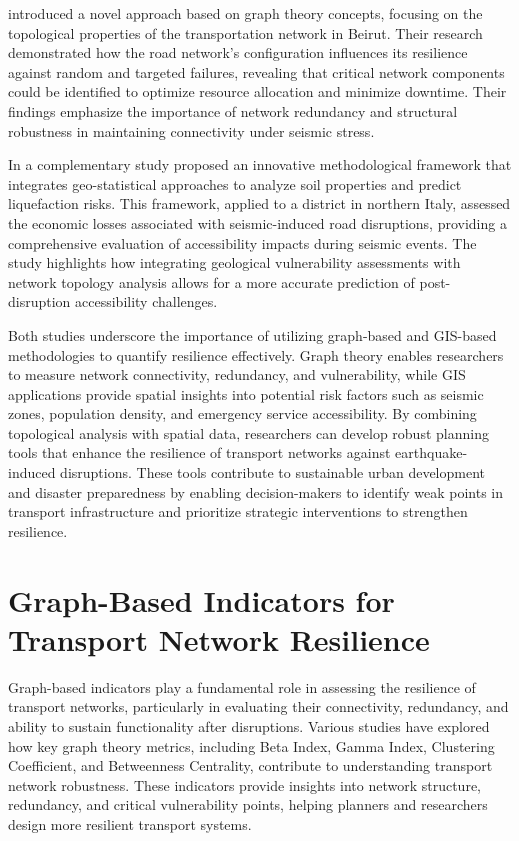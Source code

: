 \cite{rouhana2020} introduced a novel approach based on graph theory concepts, focusing on the topological properties of the transportation network in Beirut. Their research demonstrated how the road network's configuration influences its resilience against random and targeted failures, revealing that critical network components could be identified to optimize resource allocation and minimize downtime. Their findings emphasize the importance of network redundancy and structural robustness in maintaining connectivity under seismic stress.

In a complementary study \cite{ dapuzzo2022} proposed an innovative methodological framework that integrates geo-statistical approaches to analyze soil properties and predict liquefaction risks. This framework, applied to a district in northern Italy, assessed the economic losses associated with seismic-induced road disruptions, providing a comprehensive evaluation of accessibility impacts during seismic events. The study highlights how integrating geological vulnerability assessments with network topology analysis allows for a more accurate prediction of post-disruption accessibility challenges.

Both studies underscore the importance of utilizing graph-based and GIS-based methodologies to quantify resilience effectively. Graph theory enables researchers to measure network connectivity, redundancy, and vulnerability, while GIS applications provide spatial insights into potential risk factors such as seismic zones, population density, and emergency service accessibility. By combining topological analysis with spatial data, researchers can develop robust planning tools that enhance the resilience of transport networks against earthquake-induced disruptions. These tools contribute to sustainable urban development and disaster preparedness by enabling decision-makers to identify weak points in transport infrastructure and prioritize strategic interventions to strengthen resilience.

\section{Graph-Based Indicators for Transport Network Resilience}
Graph-based indicators play a fundamental role in assessing the resilience of transport networks, particularly in evaluating their connectivity, redundancy, and ability to sustain functionality after disruptions. Various studies have explored how key graph theory metrics, including Beta Index, Gamma Index, Clustering Coefficient, and Betweenness Centrality, contribute to understanding transport network robustness. These indicators provide insights into network structure, redundancy, and critical vulnerability points, helping planners and researchers design more resilient transport systems.

